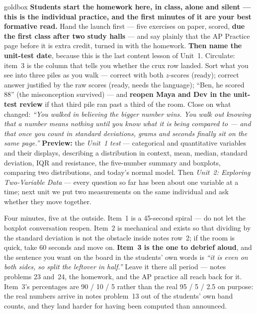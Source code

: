 \documentclass[10pt]{article}
\begin{document}
\boxguard
\begin{skillbox}{goldbox}
\textbf{Students start the homework here, in class, alone and silent --- this is the individual
practice, and the first minutes of it are your best formative read.} Hand the launch first ---
five exercises on paper, scored, \textbf{due the first class after two study halls} --- and say
plainly that the AP Practice page before it is extra credit, turned in with the homework.
\textbf{Then name the unit-test date}, because this is the last content lesson of Unit~1.
Circulate: item~3 is the column that tells you whether the crux row landed. Sort what you see
into three piles as you walk --- correct with both $z$-scores (ready); correct answer justified
by the raw scores (ready, needs the language); ``Ben, he scored 88'' (the misconception survived)
--- and \textbf{reopen Maya and Dev in the unit-test review} if that third pile ran past a third
of the room. Close on what changed: \emph{``You walked in believing the bigger number wins. You
walk out knowing that a number means nothing until you know what it is being compared to --- and
that once you count in standard deviations, grams and seconds finally sit on the same page.''}
\textbf{Preview:} the \emph{Unit~1 test} --- categorical and quantitative variables and their
displays, describing a distribution in context, mean, median, standard deviation, IQR and
resistance, the five-number summary and boxplots, comparing two distributions, and today's normal
model. Then \emph{Unit~2: Exploring Two-Variable Data} --- every question so far has been about
one variable at a time; next unit we put two measurements on the same individual and ask whether
they move together.
\end{skillbox}

\begin{teachernote}[Warm-Up]
Four minutes, five at the outside. Item~1 is a 45-second spiral --- do not let the boxplot
conversation reopen. Item~2 is mechanical and exists so that dividing by the standard deviation
is not the obstacle inside notes row~2; if the room is quick, take 60 seconds and move on.
\textbf{Item~3 is the one to debrief aloud}, and the sentence you want on the board in the
students' own words is \emph{``it is even on both sides, so split the leftover in half.''} Leave
it there all period --- notes problems 23 and~24, the homework, and the AP practice all reach
back for it. Item~3's percentages are 90 / 10 / 5 rather than the real 95 / 5 / 2.5 on purpose:
the real numbers arrive in notes problem~13 out of the students' own band counts, and they land
harder for having been computed than announced.
\end{teachernote}
\end{document}
